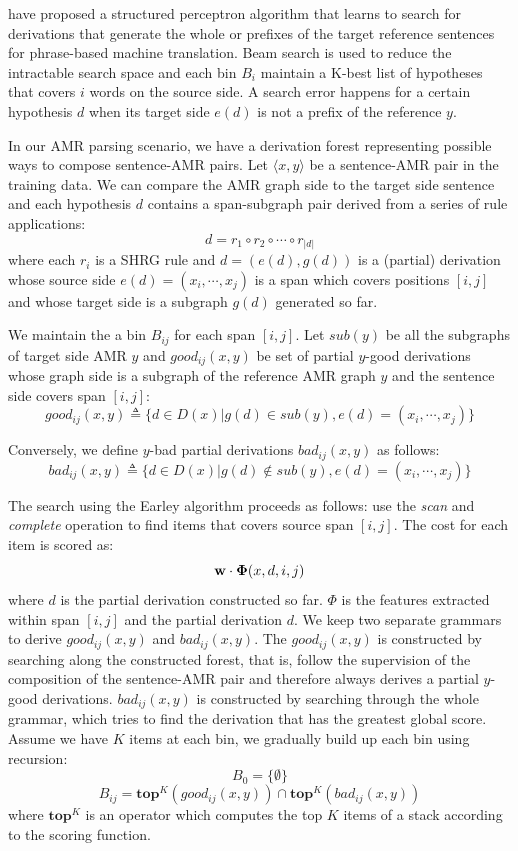  have proposed a structured perceptron algorithm that learns to search for derivations that generate the whole or prefixes of the 
target reference sentences for phrase-based machine translation. Beam search is used to reduce the intractable search space and each bin $B_i$ maintain a K-best list of hypotheses that covers $i$ words
on the source side. A search error happens for a certain hypothesis $d$ when its target side $e(d)$ is not a prefix of the reference $y$.


In our AMR parsing scenario, we have a derivation forest representing possible ways to compose sentence-AMR pairs. Let $\langle x, y\rangle$ be a sentence-AMR pair in the training data. We can 
compare the AMR graph side to the target side sentence and each hypothesis $d$ contains a span-subgraph pair derived from a series of rule applications:
$$d = r_1 \circ r_2 \circ \cdots \circ r_{|d|}$$
where each $r_i$ is a SHRG rule and $d=(e(d), g(d))$ is a (partial) derivation whose source side $e(d)=(x_i, \cdots , x_j)$ is a span which covers 
positions $[i, j]$ and whose target side is a subgraph $g(d)$ generated so far. 


We maintain the a bin $B_{ij}$ for each span $[i, j]$. Let $sub(y)$ be all the subgraphs
of target side AMR $y$ and $good_{ij} (x, y)$ be set of partial $y$-good derivations whose graph side is a subgraph of the reference AMR graph $y$
and the sentence side covers span $[i, j]$:
$$good_{ij}(x, y)\triangleq \{d \in D(x) | g(d) \in sub(y), e(d)=(x_i, \cdots , x_j)\}$$

Conversely, we define $y$-bad partial derivations $bad_{ij}(x,y)$ as follows:
$$bad_{ij}(x, y)\triangleq \{d \in D(x) | g(d) \notin sub(y), e(d)=(x_i, \cdots , x_j)\}$$

The search using the Earley algorithm proceeds as follows: use the \textit{scan} and \textit{complete} operation to find items that covers source span $[i, j]$. 
The cost for each item is scored as: 
$${\bf w} \cdot {\bf \Phi}(x, d, i, j)$$
where $d$ is the partial derivation constructed so far. $\Phi$ is the features extracted within span $[i, j]$ and the partial derivation $d$. We keep two separate
grammars to derive $good_{ij}(x, y)$ and $bad_{ij}(x, y)$. The $good_{ij}(x, y)$ is constructed by searching along the constructed forest, that is, follow the supervision of
the composition of the sentence-AMR pair and therefore always derives a partial $y$-good derivations. $bad_{ij}(x, y)$ is constructed by searching through the whole grammar, which tries to find the derivation that has the greatest
global score. Assume we have $K$ items at each bin, we gradually build up each bin using recursion:
$$B_0 = \{ \emptyset \}$$
$$B_{ij} = \textbf{top}^K (good_{ij}(x,y)) \cap \textbf{top}^K (bad_{ij}(x,y))$$
where $\textbf{top}^K$ is an operator which computes the top $K$ items of a stack according to the scoring function.


